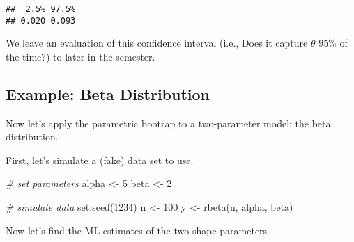 \documentclass[
]{book}
\newenvironment{Shaded}{\begin{snugshade}}{\end{snugshade}}
\newcommand{\AttributeTok}[1]{\textcolor[rgb]{0.77,0.63,0.00}{#1}}
\newcommand{\CommentTok}[1]{\textcolor[rgb]{0.56,0.35,0.01}{\textit{#1}}}
\newcommand{\ConstantTok}[1]{\textcolor[rgb]{0.00,0.00,0.00}{#1}}
\newcommand{\ControlFlowTok}[1]{\textcolor[rgb]{0.13,0.29,0.53}{\textbf{#1}}}
\newcommand{\DecValTok}[1]{\textcolor[rgb]{0.00,0.00,0.81}{#1}}
\newcommand{\FunctionTok}[1]{\textcolor[rgb]{0.00,0.00,0.00}{#1}}
\newcommand{\NormalTok}[1]{#1}
\newcommand{\OtherTok}[1]{\textcolor[rgb]{0.56,0.35,0.01}{#1}}
\newcommand{\SpecialCharTok}[1]{\textcolor[rgb]{0.00,0.00,0.00}{#1}}
\begin{document}
\begin{verbatim}
##  2.5% 97.5% 
## 0.020 0.093
\end{verbatim}

We leave an evaluation of this confidence interval (i.e., Does it
capture \(\theta\) 95\% of the time?) to later in the semester.

\hypertarget{example-beta-distribution-1}{%
\subsection{Example: Beta
Distribution}\label{example-beta-distribution-1}}

Now let's apply the parametric bootrap to a two-parameter model: the
beta distribution.

First, let's simulate a (fake) data set to use.

\begin{Shaded}
\begin{Highlighting}[]
\CommentTok{\# set parameters}
\NormalTok{alpha }\OtherTok{\textless{}{-}} \DecValTok{5}
\NormalTok{beta }\OtherTok{\textless{}{-}} \DecValTok{2}

\CommentTok{\# simulate data}
\FunctionTok{set.seed}\NormalTok{(}\DecValTok{1234}\NormalTok{)}
\NormalTok{n }\OtherTok{\textless{}{-}} \DecValTok{100}
\NormalTok{y }\OtherTok{\textless{}{-}} \FunctionTok{rbeta}\NormalTok{(n, alpha, beta)}
\end{Highlighting}
\end{Shaded}

Now let's find the ML estimates of the two shape parameters.

\begin{Shaded}
\end{Shaded}
\end{document}
